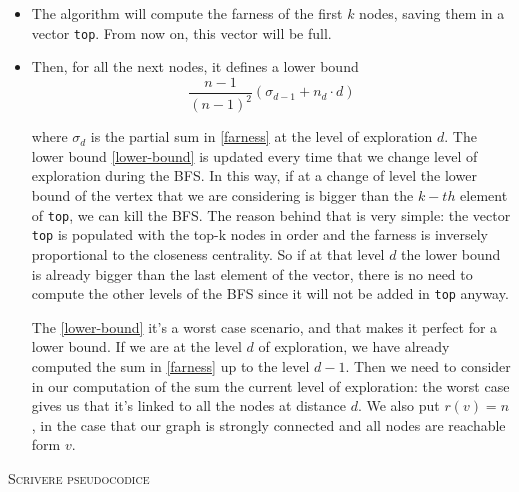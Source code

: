 \begin{itemize}
    \item The algorithm will compute the farness of the first $k$ nodes, saving them in a vector \texttt{top}. From now on, this vector will be full.

    \item Then, for all the next nodes, it defines a lower bound
    \begin{equation}\label{lower-bound}
        \frac{n-1}{(n-1)^2} (\sigma_{d-1} + n_d \cdot d)
    \end{equation}

    where $\sigma_d$ is the partial sum in \eqref{farness} at the level of exploration $d$. The lower bound \eqref{lower-bound} is updated every time that we change level of exploration during the BFS. In this way, if at a change of level the lower bound of the vertex that we are considering is bigger than the $k-th$ element of \texttt{top}, we can kill the BFS. The reason behind that is very simple: the vector \texttt{top} is populated with the top-k nodes in order and the farness is inversely proportional to the closeness centrality. So if at that level $d$ the lower bound is already bigger than the last element of the vector, there is no need to compute the other levels of the BFS since it will not be added in \texttt{top} anyway. \s

    The \eqref{lower-bound} it's a worst case scenario, and that makes it perfect for a lower bound. If we are at the level $d$ of exploration, we have already computed the sum in \eqref{farness} up to the level $d-1$. Then we need to consider in our computation of the sum the current level of exploration: the worst case gives us that it's linked to all the nodes at distance $d$. We also put $r(v)=n$, in the case that our graph is strongly connected and all nodes are reachable form $v$.
\end{itemize}

\textsc{Scrivere pseudocodice}

